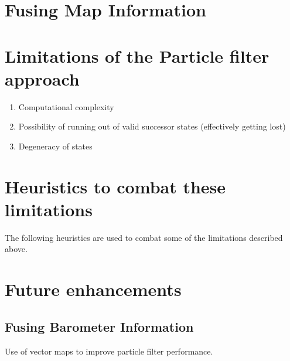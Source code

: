 
\section{Fusing Map Information}


\section{Limitations of the Particle filter approach}

\begin{enumerate}
\item Computational complexity
\item Possibility of running out of valid successor states (effectively getting lost)
\item Degeneracy of states
\end{enumerate}

\section{Heuristics to combat these limitations}

The following heuristics are used to combat some of the limitations 
described above.

\section{Future enhancements}
\subsection{Fusing Barometer Information}

Use of vector maps to improve particle filter performance.
